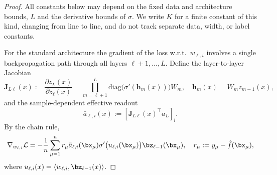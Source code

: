 \begin{proof}
All constants below may depend on the fixed data and architecture bounds,
$L$ and the derivative bounds of $\sigma$.
We write \(K\) for a finite constant of this kind, changing from line to line,
and do not track separate data, width, or label constants.

For the standard architecture the gradient of the loss w.r.t.\
\(w_{\ell,i}\) involves a single backpropagation path through all layers
\(\ell+1,\dots,L\). Define the layer-to-layer Jacobian
\begin{equation}\label{2605:eq:jacobian}
\bm{J}_{L\ell}(x)
:= \frac{\partial z_L(x)}{\partial z_\ell(x)}
= \prod_{m=\ell+1}^{L}\mathrm{diag} \bigl(\sigma'(\bm{h}_m(x))\bigr)W_m,
\quad \bm{h}_m(x)=W_m z_{m-1}(x),
\end{equation}
and the sample-dependent effective readout
\[
    \bar a_{\ell,i}(x):=[\bm J_{L\ell}(x)^\top a_L]_i .
\]
By the chain rule,
\begin{equation}\label{2605:eq:full-grad}
\nabla_{w_{\ell,i}}\mathcal{L}
= -\frac{1}{n}\sum_{\mu=1}^n
  r_\mu \bar{a}_{\ell,i}(\bx_\mu) 
  \sigma' \bigl(u_{\ell,i}(\bx_\mu)\bigr) \bz_{\ell-1}(\bx_\mu),
\quad r_\mu := y_\mu - \hat f(\bx_\mu),
\end{equation}
where $u_{\ell,i}(x)=\langle w_{\ell,i},\bz_{\ell-1}(x)\rangle$.


\end{proof}

